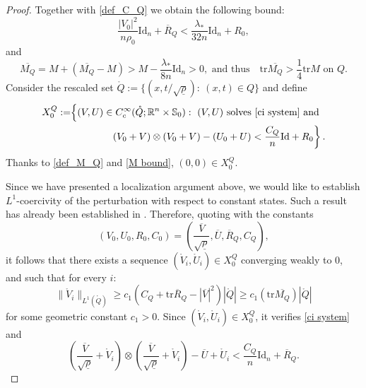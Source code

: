 \documentclass[12pt,reqno]{amsart}
\theoremstyle{definition}
\theoremstyle{remark}
\numberwithin{equation}{section}
\newcommand{\R}{{\mathbb R}}
\newcommand{\id}{\mathrm{Id}}
\newcommand{\trace}{\mathrm{tr}}
\begin{document}
\begin{proof}
Together with \eqref{def_C_Q} we obtain the following bound:
\begin{equation}\label{bound M_Q}
\frac{|V_0|^2}{n \rho_0} \id_n + \overline R_Q < \frac{\lambda_*}{32n} \id_n + R_0,
\end{equation}
and 
\begin{equation}\label{M bound}
\overline{M_Q} = M + (\overline{M_Q} - M) > M - \frac{\lambda_*}{8n} \id_n > 0, \text{ and thus} \quad \trace  \overline{M_Q} > \frac{1}{4} \trace  M \text{ on } Q.
\end{equation}
Consider the rescaled set $\mathring Q := \{ (x, t/\sqrt{\underline\rho }): \ (x, t) \in Q \}$ and define 
\[
\begin{split}
X_0^Q := & \Big\{ (V, U) \in C^\infty_c(\mathring{Q}; \R^n \times \mathbb{S}_0): \ (V, U) \text{ solves } \eqref{ci system} \text{ and }  \\
&\qquad \qquad \left. (V_0 + V) \otimes (V_0 + V) - (U_0 + U) < {C_Q \over n} \id + R_0 \right\}.
\end{split} 
\]
Thanks to \eqref{def_M_Q} and \eqref{M bound}, $(0,0) \in X_0^Q$.

Since we have presented a localization argument above, we would like to establish $L^1$-coercivity of the perturbation with respect to constant states. Such a result has already been established in \cite[Proposition 2.1]{CVY}. Therefore, quoting \cite[Proposition 2.1]{CVY} with the constants 
\[
(V_0, U_0, R_0, C_0) = \left( \frac{\overline V}{\sqrt{\underline\rho }}, \overline U, \overline R_Q, C_Q \right),
\]
it follows that there exists a sequence $(\mathring V_i,\mathring U_i)\in X^Q_0$ converging weakly to 0, and such that for every $i$:
\begin{equation*}
\|\mathring V_i\|_{L^1(\mathring Q)}\geq c_1 (C_Q+\trace   \overline R_Q-|\overline V|^2)|\mathring Q|\geq c_1 (\trace   \overline{M_Q})|\mathring Q|
\end{equation*}
for some geometric constant $c_1 > 0$. Since $(\mathring V_i, \mathring U_i)\in X^Q_0$, it verifies   \eqref{ci system} and 
$$
\left(\frac{\overline V}{\sqrt{\underline\rho }}+\mathring V_i \right)\otimes \left(\frac{\overline V}{\sqrt{\underline\rho }}+\mathring V_i \right)-\overline  U+\mathring U_i< \frac{C_Q}{n}\id_n +  \overline R_Q.
$$


\end{proof}
\end{document}
